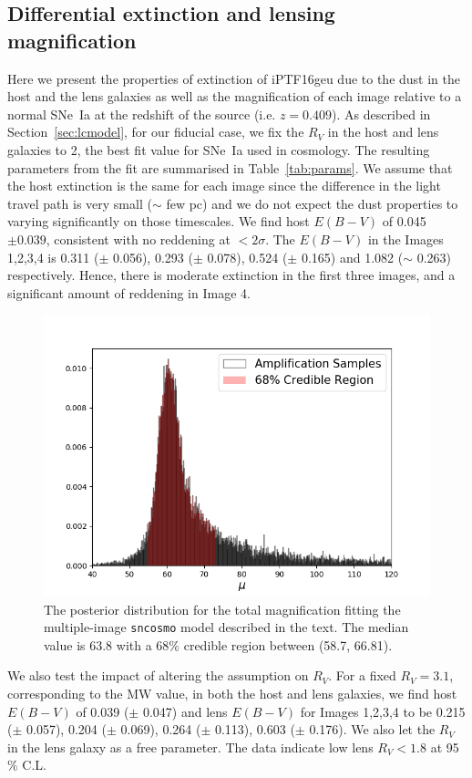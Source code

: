 \documentclass[a4paper,fleqn,usenatbib]{mnras}
\begin{document}
\subsection{Differential extinction and lensing magnification}
\label{ssec-extinction}
Here we present the properties of extinction of  iPTF16geu due to the dust in the host and the lens galaxies as well as the magnification of each image relative to a normal SNe~Ia at the redshift of the source (i.e. $z = 0.409$). As described in Section~\ref{sec:lcmodel}, for our fiducial case, we fix the $R_V$ in the host and lens galaxies to 2, the best fit value for SNe~Ia used in cosmology. 
The resulting parameters from the fit are summarised in Table~\ref{tab:params}. We assume that the host extinction is the same for each image since the difference in the light travel path is very small ($\sim$ few pc) and we do not expect the dust properties to varying significantly on those timescales. We find host $E(B-V)$ of 0.045 $\pm 0.039$, consistent with no reddening at $< 2 \sigma$. The $E(B-V)$ in the Images 1,2,3,4 is 0.311 ($\pm$ 0.056), 0.293 ($\pm$ 0.078), 0.524 ($\pm$ 0.165) and 1.082 ($\sim$ 0.263) respectively. Hence, there is moderate extinction in the first three images, and a significant amount of reddening in Image 4.

\begin{figure}
    \centering
    \includegraphics[width=.5\textwidth]{amplif_dist_forpaper_linscale.png}
    \caption{The posterior distribution for the total magnification fitting the multiple-image \texttt{sncosmo} model described in the text. The median value is 63.8 with a 68$\%$ credible region between (58.7, 66.81).}
    \label{fig:amp}
\end{figure}

We also test the impact of altering the assumption on $R_V$. For a fixed $R_V = 3.1$, corresponding to the MW value, in both the host and lens galaxies, we find host $E(B-V)$ of 0.039 ($\pm$ 0.047) and lens $E(B-V)$ for Images 1,2,3,4 to be 0.215 ($\pm$ 0.057), 0.204 ($\pm$ 0.069), 0.264 ($\pm$ 0.113), 0.603 ($\pm$ 0.176). 
We also let the $R_V$ in the lens galaxy as a free parameter. The data indicate low lens $R_V < 1.8$ at 95 $\%$ C.L. 
\end{document}

